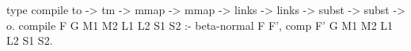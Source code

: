 \begin{elpicode}
type compile to -> tm -> mmap -> mmap ->  links -> links -> 
  subst -> subst -> o.
compile F G M1 M2 L1 L2 S1 S2 :-
  beta-normal F F', comp F' G M1 M2 L1 L2 S1 S2.
\end{elpicode}
